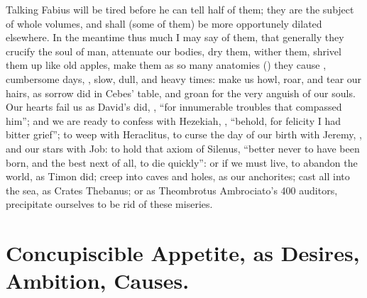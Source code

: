 
Talking Fabius will be tired before he can tell half of them; they are the
subject of whole volumes, and shall (some of them) be more opportunely dilated
elsewhere. In the meantime thus much I may say of them, that generally they
crucify the soul of man, attenuate our bodies, dry them,
wither them, shrivel them up like old apples, make them as so many anatomies
() they
cause , cumbersome days, , slow, dull, and heavy times: make us howl, roar, and tear our hairs,
as sorrow did in Cebes' table, and groan for the very
anguish of our souls. Our hearts fail us as David's did, , \enquote{for innumerable troubles that compassed him}; and we are ready
to confess with Hezekiah, , \enquote{behold, for
felicity I had bitter grief}; to weep with Heraclitus, to curse the day of our
birth with Jeremy, , and our stars with Job: to hold that axiom
of Silenus, \enquote{better never to have been born, and the best
next of all, to die quickly}: or if we must live, to abandon the world, as
Timon did; creep into caves and holes, as our anchorites; cast all into the
sea, as Crates Thebanus; or as Theombrotus Ambrociato's 400 auditors,
precipitate ourselves to be rid of these miseries.

\section{Concupiscible Appetite, as Desires, Ambition, Causes.}


